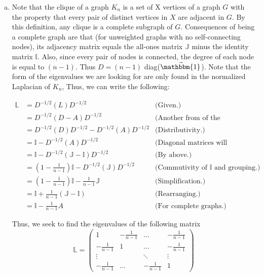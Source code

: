 \documentclass[10pt]{article}
\newcommand{\1}{\vec{\mathbbm{1}}}
\begin{document}
{\begin{enumerate}[(a)]
    But the norm of $\boldsymbol{\Delta}$ squared is just the sum of the squares of the components of $\boldsymbol{\Delta}$. Thus, 

    \[
    (\textbf{x}(n) - \textbf{x}(1))^2 \leq (n-1)\sum_{u = 1}^{n - 1}(\textbf{x}(u+1) - \textbf{x}(u))^2
    \]

    which is what we wanted to show. \hfill $\square$

    \item Note that the clique of a graph $K_n$ is a set of X vertices of a graph $G$ with the property that every pair of distinct vertices in $X$ are adjacent in $G$. By this definition, any clique is a complete subgraph of $G$. Consequences of being a complete graph are that (for unweighted graphs with no self-connecting nodes), its adjacency matrix equals the all-ones matrix $\mathbb{J}$ minus the identity matrix $\mathbb{I}$. Also, since every pair of nodes is connected, the degree of each node is equal to $(n - 1)$. Thus $D = (n-1)$ diag($\1$). Note that the form of the eigenvalues we are looking for are only found in the normalized Laplacian of $K_n$, Thus, we can write the following:

    \begin{align}
        \mathbb{L} &= D^{-1/2}(L)D^{-1/2} &\text{(Given.)}\nonumber\\
        &= D^{-1/2}(D-A)D^{-1/2} &\text{(Another from of the Laplacian.)}\nonumber\\
        &= D^{-1/2}(D)D^{-1/2} -D^{-1/2}(A)D^{-1/2} &\text{(Distributivity.)}\nonumber\\
        &= \mathbb{I} - D^{-1/2}(A) D^{-1/2} &\text{(Diagonal matrices will cancel.)} \nonumber\\
        &= \mathbb{I} - D^{-1/2}(\mathbb{J} - \mathbb{I}) D^{-1/2} &\text{(By above.)}\nonumber\\
        &= (1 - \frac{1}{n-1})\mathbb{I} - D^{-1/2}(\mathbb{J})D^{-1/2} &\text{(Commutivity of $\mathbb{I}$ and grouping.)}\nonumber\\
        &= (1 - \frac{1}{n-1})\mathbb{I} -\frac{1}{n-1}\mathbb{J} &\text{(Simplification.)}\nonumber\\
        &= \mathbb{I} + \frac{1}{n-1}(\mathbb{J} - \mathbb{I}) &\text{(Rearranging.)}\nonumber\\
        &= \mathbb{I} - \frac{1}{n-1}A &\text{(For complete graphs.)}\nonumber
    \end{align}

    Thus, we seek to find the eigenvalues of the following matrix
    \[
    \mathbb{L} = 
    \begin{pmatrix}
    1 &-\frac{1}{n-1} &\dots &-\frac{1}{n-1}\\
    -\frac{1}{n-1} &1 &\dots &-\frac{1}{n-1}\\
    \vdots &&\ddots &\vdots\\
    -\frac{1}{n-1} &\dots &-\frac{1}{n-1} &1
    \end{pmatrix}
    \]


\end{enumerate}}
\end{document}

